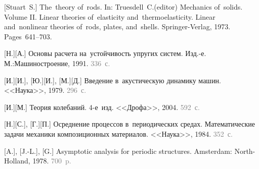 \vspace*{10mm}


\newcommand\howmanypages[1]{\textcolor{gray}{#1}}

\newcommand\mirpublisher{<<Мир>>} %
\newcommand\naukapublisher{<<Наука>>} %
\newcommand\fizmatgiz{М.:\;Физ\-мат\-гиз}

\begin{thebibliography}{123}
\small

\thispagestyle{empty}


\begin{otherlanguage}{russian}

[Stuart~S.] The~theory of~rods. In: Truesdell~C.\:(editor) Mechanics of~solids. Volume II. Linear theories of~elasticity and~thermoelasticity. Linear and~nonlinear theories of~rods, plates, and~shells. Springer\hbox{-}Verlag, 1973. Pages~641\hbox{--}703.

[Н.][А.] Основы расчета на~устойчивость упругих систем. Изд.\hbox{-}е. М.:\;Машино\-строение, 1991. \howmanypages{336~с.}

[И.][И.], [Ю.][И.], [М.][Д.] Введение в~акустическую динамику машин. \naukapublisher, 1979. \howmanypages{296~с.}

[И.][М.] Теория колебаний. 4\hbox{-}е~изд. <<Дрофа>>, 2004. \howmanypages{592~с.}

[Н.][С.], [Г.][П.] Осреднение процессов в~периодических средах. Математические задачи механики композиционных материалов. \naukapublisher, 1984. \howmanypages{352~с.}

[A.], %
[J.-L.], %
[G.]
Asymptotic analysis for periodic structures. Amsterdam: North\hbox{-}Holland, 1978. \howmanypages{700~p.}


\end{otherlanguage}
\end{thebibliography}
